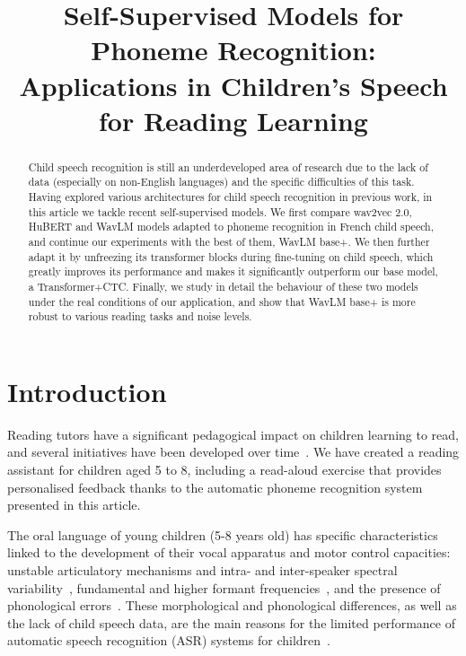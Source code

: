 \documentclass{Interspeech2024}
\title{Self-Supervised Models for Phoneme Recognition: Applications in Children's Speech for Reading Learning}
\begin{document}
\maketitle

\begin{abstract}
    
    Child speech recognition is still an underdeveloped area of research due to the lack of data (especially on non-English languages) and the specific difficulties of this task. Having explored various architectures for child speech recognition in previous work, in this article we tackle recent self-supervised models. We first compare wav2vec 2.0, HuBERT and WavLM models adapted to phoneme recognition in French child speech, and continue our experiments with the best of them, WavLM base+. We then further adapt it by unfreezing its transformer blocks during fine-tuning on child speech, which greatly improves its performance and makes it significantly outperform our base model, a Transformer+CTC. Finally, we study in detail the behaviour of these two models under the real conditions of our application, and show that WavLM base+ is more robust to various reading tasks and noise levels.
\end{abstract}

\section{Introduction}

Reading tutors have a significant pedagogical impact on children learning to read, and several initiatives have been developed over time~\cite{Mostow2001-ETT, Bolanos11-FOR,Godde2017-EOR}. 
We have created a reading assistant for children aged 5 to 8, including a read-aloud exercise that provides personalised feedback thanks to the automatic phoneme recognition system presented in this article.

The oral language of young children (5-8 years old) has specific characteristics linked to the development of their vocal apparatus and motor control capacities: unstable articulatory mechanisms and intra- and inter-speaker spectral variability~\cite{Lee99-AOC}, fundamental and higher formant frequencies~\cite{Mugitani12-DOV}, and the presence of phonological errors~\cite{Fringi15-EOP}. These morphological and phonological differences, as well as the lack of child speech data, are the main reasons for the limited performance of automatic speech recognition (ASR) systems for children~\cite{Potamianos2003-RRO,Shivakumar20-TLF,Yeung18-OTD}.
\end{document}
